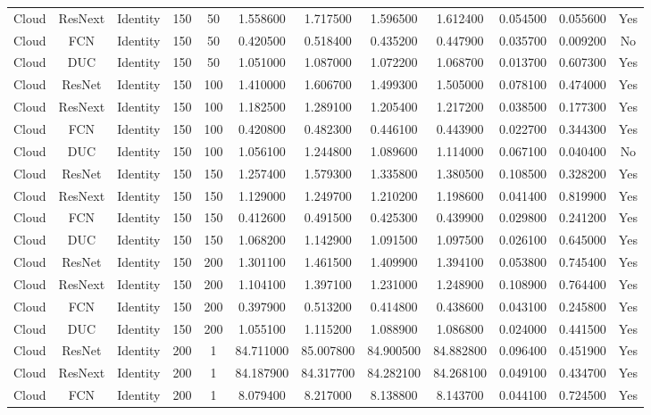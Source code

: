 \begin{tabular}{|c||c||c||c||c||c||c||c||c||c||c||c|}
Cloud & ResNext & Identity & 150 & 50 & 1.558600 & 1.717500 & 1.596500 & 1.612400 & 0.054500 & 0.055600 & Yes \\
Cloud & FCN & Identity & 150 & 50 & 0.420500 & 0.518400 & 0.435200 & 0.447900 & 0.035700 & 0.009200 & No \\
Cloud & DUC & Identity & 150 & 50 & 1.051000 & 1.087000 & 1.072200 & 1.068700 & 0.013700 & 0.607300 & Yes \\
Cloud & ResNet & Identity & 150 & 100 & 1.410000 & 1.606700 & 1.499300 & 1.505000 & 0.078100 & 0.474000 & Yes \\
Cloud & ResNext & Identity & 150 & 100 & 1.182500 & 1.289100 & 1.205400 & 1.217200 & 0.038500 & 0.177300 & Yes \\
Cloud & FCN & Identity & 150 & 100 & 0.420800 & 0.482300 & 0.446100 & 0.443900 & 0.022700 & 0.344300 & Yes \\
Cloud & DUC & Identity & 150 & 100 & 1.056100 & 1.244800 & 1.089600 & 1.114000 & 0.067100 & 0.040400 & No \\
Cloud & ResNet & Identity & 150 & 150 & 1.257400 & 1.579300 & 1.335800 & 1.380500 & 0.108500 & 0.328200 & Yes \\
Cloud & ResNext & Identity & 150 & 150 & 1.129000 & 1.249700 & 1.210200 & 1.198600 & 0.041400 & 0.819900 & Yes \\
Cloud & FCN & Identity & 150 & 150 & 0.412600 & 0.491500 & 0.425300 & 0.439900 & 0.029800 & 0.241200 & Yes \\
Cloud & DUC & Identity & 150 & 150 & 1.068200 & 1.142900 & 1.091500 & 1.097500 & 0.026100 & 0.645000 & Yes \\
Cloud & ResNet & Identity & 150 & 200 & 1.301100 & 1.461500 & 1.409900 & 1.394100 & 0.053800 & 0.745400 & Yes \\
Cloud & ResNext & Identity & 150 & 200 & 1.104100 & 1.397100 & 1.231000 & 1.248900 & 0.108900 & 0.764400 & Yes \\
Cloud & FCN & Identity & 150 & 200 & 0.397900 & 0.513200 & 0.414800 & 0.438600 & 0.043100 & 0.245800 & Yes \\
Cloud & DUC & Identity & 150 & 200 & 1.055100 & 1.115200 & 1.088900 & 1.086800 & 0.024000 & 0.441500 & Yes \\
Cloud & ResNet & Identity & 200 & 1 & 84.711000 & 85.007800 & 84.900500 & 84.882800 & 0.096400 & 0.451900 & Yes \\
Cloud & ResNext & Identity & 200 & 1 & 84.187900 & 84.317700 & 84.282100 & 84.268100 & 0.049100 & 0.434700 & Yes \\
Cloud & FCN & Identity & 200 & 1 & 8.079400 & 8.217000 & 8.138800 & 8.143700 & 0.044100 & 0.724500 & Yes \\

\end{tabular}
